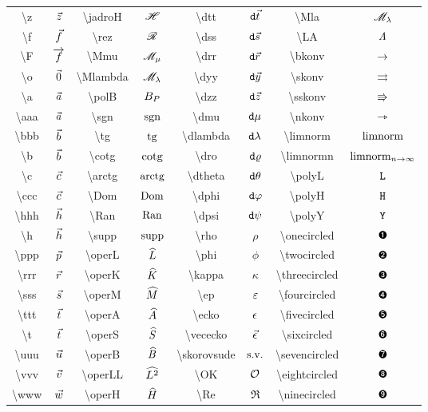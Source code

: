 \begin{tabular}{cccccccc}
\textbackslash z&${\vec{z}}$&\textbackslash jadroH&${\mathscr H}$&\textbackslash dtt&$\mathtt{d}{\vec{t}}$&\textbackslash Mla&$\mathscr{M}_\lambda$\\
\textbackslash f&${\vec{f}}$&\textbackslash rez&${\mathscr R}$&\textbackslash dss&$\mathtt{d}{\vec{s}}$&\textbackslash LA&${\mathit \Lambda}$\\
\textbackslash F&${\overrightarrow{f}}$&\textbackslash Mmu&$\mathscr{M}_\mu$&\textbackslash drr&$\mathtt{d}{\vec{r}}$&\textbackslash bkonv&$\rightarrow$\\
\textbackslash o&${\vec{0}}$&\textbackslash Mlambda&$\mathscr{M}_\lambda$&\textbackslash dyy&$\mathtt{d}{\vec{y}}$&\textbackslash skonv&$\rightrightarrows$\\
\textbackslash a&${\vec{a}}$&\textbackslash polB&${B_P}$&\textbackslash dzz&$\mathtt{d}{\vec{z}}$&\textbackslash sskonv&$\Rrightarrow$\\
\textbackslash aaa&${\vec{a}}$&\textbackslash sgn&$\mathrm{sgn}$&\textbackslash dmu&$\mathtt{d}\mu$&\textbackslash nkonv&$\rightarrowtriangle$\\
\textbackslash bbb&${\vec{b}}$&\textbackslash tg&${\mathrm{tg}}$&\textbackslash dlambda&$\mathtt{d}\lambda$&\textbackslash limnorm&$\mathop{\mathrm{limnorm}}$\\
\textbackslash b&${\vec{b}}$&\textbackslash cotg&${\mathrm{cotg}}$&\textbackslash dro&$\mathtt{d}\varrho$&\textbackslash limnormn&$\mathop{\mathrm{limnorm}}_{n \rightarrow \infty}$\\
\textbackslash c&$\vec{c}$&\textbackslash arctg&${\mathrm{arctg}}$&\textbackslash dtheta&$\mathtt{d}\theta$&\textbackslash polyL&${\mathtt L}$\\
\textbackslash ccc&${\vec{c}}$&\textbackslash Dom&${\mathrm{Dom}}$&\textbackslash dphi&$\mathtt{d}\varphi$&\textbackslash polyH&${\mathtt H}$\\
\textbackslash hhh&${\vec{h}}$&\textbackslash Ran&${\mathrm{Ran}}$&\textbackslash dpsi&$\mathtt{d}\psi$&\textbackslash polyY&${\mathtt Y}$\\
\textbackslash h&${\vec{h}}$&\textbackslash supp&${\mathrm{supp}}$&\textbackslash rho&$\rho$&\textbackslash onecircled&$\onecircled$\\
\textbackslash ppp&${\vec{p}}$&\textbackslash operL&$\widehat{L}$&\textbackslash phi&$\phi$&\textbackslash twocircled&$\twocircled$\\
\textbackslash rrr&${\vec{r}}$&\textbackslash operK&$\widehat{K}$&\textbackslash kappa&$\kappa$&\textbackslash threecircled&$\threecircled$\\
\textbackslash sss&${\vec{s}}$&\textbackslash operM&$\widehat{M}$&\textbackslash ep&$\varepsilon$&\textbackslash fourcircled&$\fourcircled$\\
\textbackslash ttt&${\vec{t}}$&\textbackslash operA&$\widehat{A}$&\textbackslash ecko&$\epsilon$&\textbackslash fivecircled&$\fivecircled$\\
\textbackslash t&${\vec{t}}$&\textbackslash operS&$\widehat{S}$&\textbackslash vececko&$\vec{\epsilon}$&\textbackslash sixcircled&$\sixcircled$\\
\textbackslash uuu&${\vec{u}}$&\textbackslash operB&$\widehat{B}$&\textbackslash skorovsude&$\mathrm{s.v.}$&\textbackslash sevencircled&$\sevencircled$\\
\textbackslash vvv&${\vec{v}}$&\textbackslash operLL&$\widehat{L^2}$&\textbackslash OK&${\mathcal O}$&\textbackslash eightcircled&$\eightcircled$\\
\textbackslash www&${\vec{w}}$&\textbackslash operH&$\widehat{H}$&\textbackslash Re&$\Re$&\textbackslash ninecircled&$\ninecircled$\\
\end{tabular}
